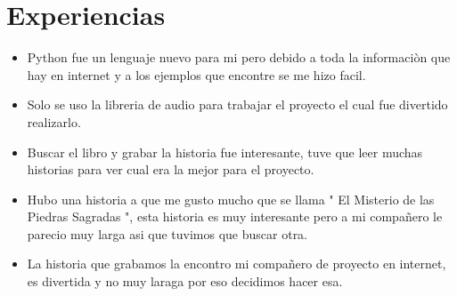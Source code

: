 \section{ Experiencias}
\begin{itemize}
\item Python fue un lenguaje nuevo para mi pero debido a toda la informaciòn que hay en internet y a los ejemplos que encontre se me hizo facil. 
\item Solo se uso la libreria de audio para trabajar el proyecto el cual fue divertido realizarlo.  
\item Buscar el libro y grabar la historia fue interesante, tuve que leer muchas historias para ver cual era la mejor para el proyecto.
\item Hubo una historia a que me gusto mucho que se llama " El Misterio de las Piedras Sagradas ", esta historia es muy interesante pero a mi compañero le parecio muy larga asi que tuvimos que buscar otra.
\item La historia que grabamos la encontro mi compañero de proyecto en internet, es divertida y no muy laraga por eso decidimos hacer esa.
   
\end{itemize}


